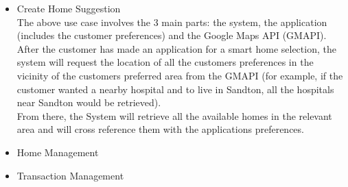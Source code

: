 \documentclass[12pt]{article}
\begin{document}
\begin{itemize}
\item Create Home Suggestion\\
The above use case involves the 3 main parts: the system, the application (includes the customer preferences) and the Google Maps API (GMAPI).\\
After the customer has made an application for a smart home selection, the system will request the location of all the customers preferences in the vicinity of the customers preferred area from the GMAPI (for example, if the customer wanted a nearby hospital and to live in Sandton, all the hospitals near Sandton would be retrieved).\\
From there, the System will retrieve all the available homes in the relevant area and will cross reference them with the applications preferences.

\item Home Management\\

\item Transaction Management

\end{itemize}
\end{document}
